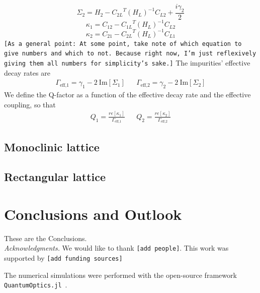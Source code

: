 \documentclass[aps,pra,superscriptaddress,twocolumn]{revtex4-1}
\newcommand{\im}{\mathrm{Im}}
\newcommand{\commentSB}[1]{\texttt{\color{blue}[#1]}}
\newcommand{\commentSO}[1]{\texttt{\color{orange}[#1]}}
\begin{document}
\begin{equation}
    \Sigma_2 = H_2 - {C_{2L}}^T (H_L)^{-1} C_{L2} + \frac{i \gamma_2}{2}
\end{equation}
\begin{equation}
    \kappa_1 = C_{12} - {C_{1L}}^T (H_L)^{-1} C_{L2} 
\end{equation}
\begin{equation}
    \kappa_2 = C_{21} - {C_{2L}}^T (H_L)^{-1} C_{L1} 
\end{equation}
\commentSB{As a general point: At some point, take note of which equation to give numbers and which to not. Because right now, I'm just reflexively giving them all numbers for simplicity's sake.}
The impurities' effective decay rates are 
\begin{align}
    \Gamma_\text{eff,1} = \gamma_1 - 2~\im[\Sigma_1] &&
    \Gamma_\text{eff,2} = \gamma_2 - 2~\im[\Sigma_2]
\end{align}
We define the Q-factor as a function of the effective decay rate and the effective coupling, so that 
\begin{align}
    Q_1 = \frac{re[\kappa_1]}{\Gamma_\text{eff,1}} && Q_2 = \frac{re[\kappa_2]}{\Gamma_\text{eff,2}} 
\end{align}

\subsection{Monoclinic lattice}


\subsection{Rectangular lattice}


\section{Conclusions and Outlook}\label{sec:conclusion}

These are the Conclusions.\\[2ex]

\emph{Acknowledgments.} We would like to thank \commentSO{add people}. This work was supported by \commentSO{add funding sources}

The numerical simulations were performed with the open-source framework \texttt{QuantumOptics.jl}~\cite{kramer_quantumopticsjl_2018}.




\end{document}
